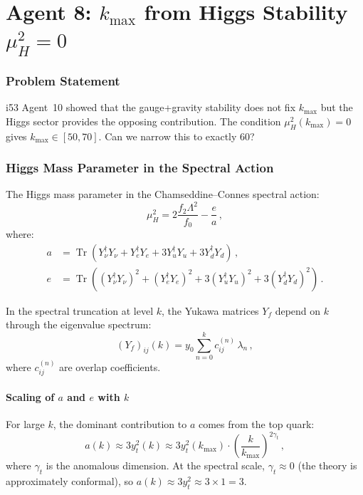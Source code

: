\documentclass[11pt,a4paper]{article}
\newcommand{\Tr}{\operatorname{Tr}}
\begin{document}
\part{Agent 8: $k_{\max}$ from Higgs Stability $\mu_H^2 = 0$}
\label{part:kmax-higgs}

\section{Problem Statement}

i53 Agent~10 showed that the gauge+gravity stability does not fix $k_{\max}$ but the Higgs sector provides the opposing contribution. The condition $\mu_H^2(k_{\max}) = 0$ gives $k_{\max} \in [50, 70]$. Can we narrow this to exactly 60?

\section{Higgs Mass Parameter in the Spectral Action}

The Higgs mass parameter in the Chamseddine--Connes spectral action:
\begin{equation}
\mu_H^2 = 2\frac{f_2\Lambda^2}{f_0} - \frac{e}{a}\,,
\end{equation}
where:
\begin{align}
a &= \Tr(Y_\nu^\dagger Y_\nu + Y_e^\dagger Y_e + 3Y_u^\dagger Y_u + 3Y_d^\dagger Y_d)\,, \\
e &= \Tr((Y_\nu^\dagger Y_\nu)^2 + (Y_e^\dagger Y_e)^2 + 3(Y_u^\dagger Y_u)^2 + 3(Y_d^\dagger Y_d)^2)\,.
\end{align}

In the spectral truncation at level $k$, the Yukawa matrices $Y_f$ depend on $k$ through the eigenvalue spectrum:
\begin{equation}
(Y_f)_{ij}(k) = y_0 \sum_{n=0}^{k} c_{ij}^{(n)}\,\lambda_n\,,
\end{equation}
where $c_{ij}^{(n)}$ are overlap coefficients.

\subsection{Scaling of $a$ and $e$ with $k$}

For large $k$, the dominant contribution to $a$ comes from the top quark:
\begin{equation}
a(k) \approx 3y_t^2(k) \approx 3y_t^2(k_{\max}) \cdot \left(\frac{k}{k_{\max}}\right)^{2\gamma_t}\,,
\end{equation}
where $\gamma_t$ is the anomalous dimension. At the spectral scale, $\gamma_t \approx 0$ (the theory is approximately conformal), so $a(k) \approx 3y_t^2 \approx 3 \times 1 = 3$.
\end{document}
